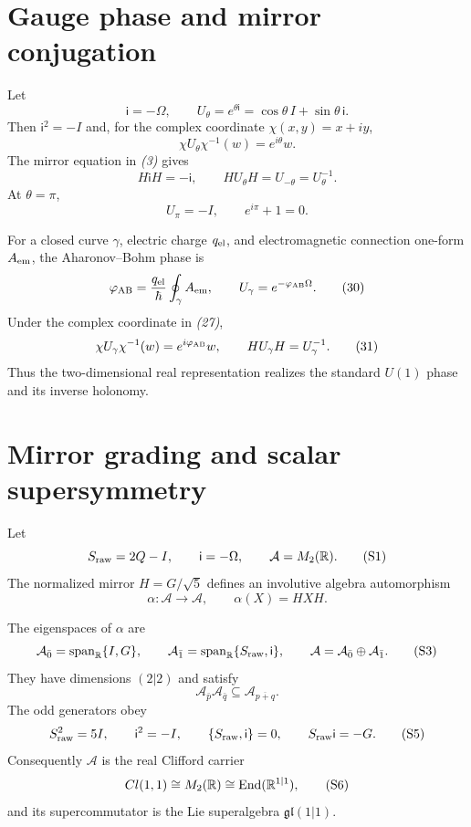 \section{Gauge phase and mirror conjugation}

Let
\[
\mathsf i=-\Omega,\qquad
U_\theta=e^{\theta\mathsf i}
=\cos\theta\,I+\sin\theta\,\mathsf i.
\tag{26}
\]
Then $\mathsf i^2=-I$ and, for the complex coordinate
$\chi(x,y)=x+iy$,
\[
\chi U_\theta\chi^{-1}(w)=e^{i\theta}w.
\tag{27}
\]
The mirror equation in \emph{(3)} gives
\[
H\mathsf iH=-\mathsf i,\qquad
HU_\theta H=U_{-\theta}=U_\theta^{-1}.
\tag{28}
\]
At $\theta=\pi$,
\[
U_\pi=-I,\qquad e^{i\pi}+1=0.
\tag{29}
\]

For a closed curve $\gamma$, electric charge $q_{\rm el}$, and electromagnetic
connection one-form $A_{\rm em}$, the Aharonov--Bohm phase is
\[
\varphi_{\rm AB}=\frac{q_{\rm el}}{\hbar}\oint_\gamma A_{\rm em},
\qquad
U_\gamma=e^{-\varphi_{\rm AB}\Omega}.
\tag{30}
\]
Under the complex coordinate in \emph{(27)},
\[
\chi U_\gamma\chi^{-1}(w)=e^{i\varphi_{\rm AB}}w,
\qquad
HU_\gamma H=U_\gamma^{-1}.
\tag{31}
\]
Thus the two-dimensional real representation realizes the standard
$U(1)$ phase and its inverse holonomy.

\section{Mirror grading and scalar supersymmetry}

Let
\[
S_{\rm raw}=2Q-I,
\qquad
\mathsf i=-\Omega,
\qquad
\mathcal A=M_2(\mathbb R).
\tag{S1}
\]
The normalized mirror $H=G/\sqrt5$ defines an involutive algebra
automorphism
\[
\alpha:\mathcal A\longrightarrow\mathcal A,
\qquad
\alpha(X)=HXH.
\tag{S2}
\]

\begin{theorem}
The eigenspaces of $\alpha$ are
\[
\mathcal A_{\bar0}=\operatorname{span}_{\mathbb R}\{I,G\},
\qquad
\mathcal A_{\bar1}=\operatorname{span}_{\mathbb R}\{S_{\rm raw},\mathsf i\},
\qquad
\mathcal A=\mathcal A_{\bar0}\oplus\mathcal A_{\bar1}.
\tag{S3}
\]
They have dimensions $(2|2)$ and satisfy
\[
\mathcal A_{\bar p}\mathcal A_{\bar q}
\subseteq\mathcal A_{\overline{p+q}}.
\tag{S4}
\]
The odd generators obey
\[
S_{\rm raw}^2=5I,
\qquad
\mathsf i^2=-I,
\qquad
\{S_{\rm raw},\mathsf i\}=0,
\qquad
S_{\rm raw}\mathsf i=-G.
\tag{S5}
\]
Consequently $\mathcal A$ is the real Clifford carrier
\[
Cl(1,1)\cong M_2(\mathbb R)\cong\operatorname{End}(\mathbb R^{1|1}),
\tag{S6}
\]
and its supercommutator is the Lie superalgebra $\mathfrak{gl}(1|1)$.
\end{theorem}

